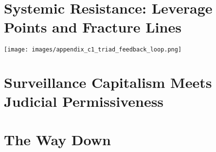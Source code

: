 \documentclass[12pt]{book}
\begin{document}
\chapter{Systemic Resistance: Leverage Points and Fracture Lines}
\texttt{[image: images/appendix\_c1\_triad\_feedback\_loop.png]}


\chapter{Surveillance Capitalism Meets Judicial Permissiveness}


\chapter{The Way Down}

\end{document}
